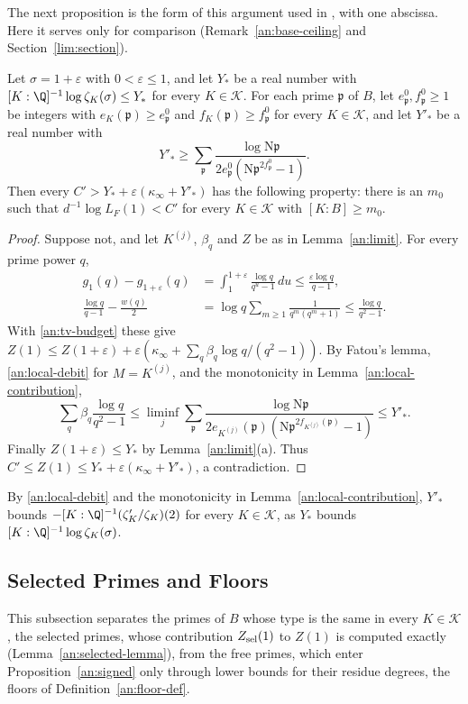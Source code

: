 The next proposition is the form of this argument used in
\cite{Naslund04273}, with one abscissa. Here it serves only for comparison
(Remark~\ref{an:base-ceiling} and Section~\ref{lim:section}).

\begin{proposition}\label{an:prime-budget}
Let $\sigma=1+\varepsilon$ with $0<\varepsilon\le1$, and let $Y_*$ be a real
number with $[K:\Q]^{-1}\log\zeta_K(\sigma)\le Y_*$ for every
$K\in\mathcal K$. For each prime $\mathfrak p$ of $B$, let
$e^0_{\mathfrak p},f^0_{\mathfrak p}\ge1$ be integers with
$e_K(\mathfrak p)\ge e^0_{\mathfrak p}$ and $f_K(\mathfrak p)\ge
f^0_{\mathfrak p}$ for every $K\in\mathcal K$, and let $Y'_*$ be a real
number with
\[
 Y'_*\ge\sum_{\mathfrak p}\frac{\log\mathrm N\mathfrak p}
 {2e^0_{\mathfrak p}(\mathrm N\mathfrak p^{2f^0_{\mathfrak p}}-1)}.
\]
Then every $C'>Y_*+\varepsilon(\kappa_\infty+Y'_*)$ has the following
property: there is an $m_0$ such that $d^{-1}\log L_F(1)<C'$ for every
$K\in\mathcal K$ with $[K:B]\ge m_0$.
\end{proposition}

\begin{proof}
Suppose not, and let $K^{(j)}$, $\beta_q$ and $Z$ be as in
Lemma~\ref{an:limit}. For every prime power $q$,
\begin{align*}
 g_1(q)-g_{1+\varepsilon}(q)&=\int_1^{1+\varepsilon}\frac{\log q}{q^u-1}\,du
 \le\frac{\varepsilon\log q}{q-1},\\
 \frac{\log q}{q-1}-\frac{w(q)}2&=\log q\sum_{m\ge1}\frac1{q^m(q^m+1)}
 \le\frac{\log q}{q^2-1}.
\end{align*}
With \eqref{an:tv-budget} these give
$Z(1)\le Z(1+\varepsilon)+\varepsilon(\kappa_\infty+\sum_q\beta_q\log q/(q^2-1))$.
By Fatou's lemma, \eqref{an:local-debit} for $M=K^{(j)}$, and the monotonicity
in Lemma~\ref{an:local-contribution},
\[
 \sum_q\beta_q\frac{\log q}{q^2-1}
 \le\liminf_j\sum_{\mathfrak p}\frac{\log\mathrm N\mathfrak p}
 {2e_{K^{(j)}}(\mathfrak p)(\mathrm N\mathfrak p^{2f_{K^{(j)}}(\mathfrak p)}-1)}
 \le Y'_*.
\]
Finally $Z(1+\varepsilon)\le Y_*$ by Lemma~\ref{an:limit}(a). Thus
$C'\le Z(1)\le Y_*+\varepsilon(\kappa_\infty+Y'_*)$, a contradiction.
\end{proof}

By \eqref{an:local-debit} and the monotonicity in
Lemma~\ref{an:local-contribution}, $Y'_*$ bounds
$-[K:\Q]^{-1}(\zeta_K'/\zeta_K)(2)$ for every $K\in\mathcal K$, as $Y_*$
bounds $[K:\Q]^{-1}\log\zeta_K(\sigma)$.


\subsection{Selected Primes and Floors}\label{an:selected}
This subsection separates the primes of $B$ whose type is the same in every
$K\in\mathcal K$, the selected primes, whose contribution $Z_{\rm sel}(1)$
to $Z(1)$ is computed exactly (Lemma~\ref{an:selected-lemma}), from the free
primes, which enter Proposition~\ref{an:signed} only through lower bounds
for their residue degrees, the floors of Definition~\ref{an:floor-def}.

